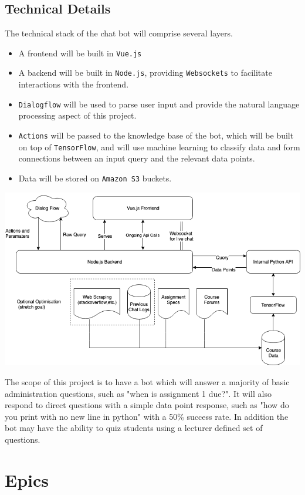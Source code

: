 \documentclass{article}
\begin{document}
\subsection{Technical Details}

The technical stack of the chat bot will comprise several layers.

\begin{itemize}
  \item A frontend will be built in \texttt{Vue.js}
  \item A backend will be built in \texttt{Node.js}, providing \texttt{Websockets} to facilitate interactions with the frontend.
  \item \texttt{Dialogflow} will be used to parse user input and provide the natural language processing aspect of this project.
  \item \texttt{Actions} will be passed to the knowledge base of the bot, which will be built on top of \texttt{TensorFlow}, and will use machine learning to classify data and form connections between an input query and the relevant data points.
  \item Data will be stored on \texttt{Amazon S3} buckets.
\end{itemize}

\includegraphics[width=\textwidth]{architecture_diagram.png}

The scope of this project is to have a bot which will answer a majority of basic administration questions, such as "when is assignment 1 due?". It will also respond to direct questions with a simple data point response, such as "how do you print with no new line in python" with a 50\% success rate. In addition the bot may have the ability to quiz students using a lecturer defined set of questions.


\section{Epics}
\end{document}
